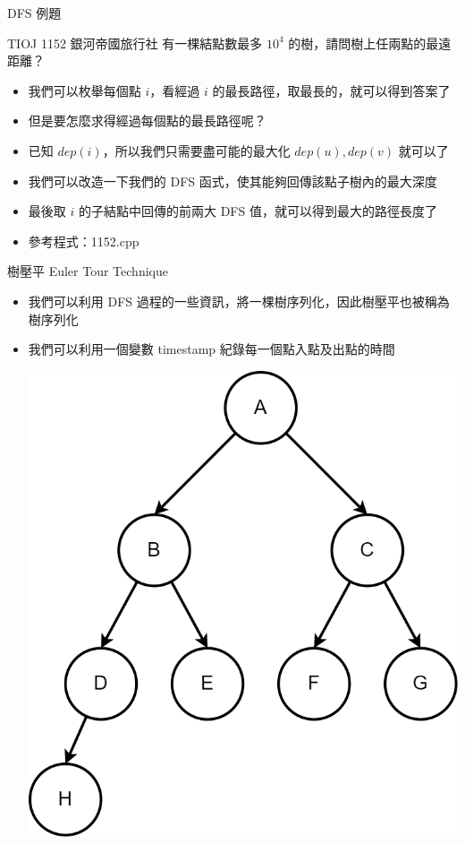 \documentclass[aspectratio=169]{beamer}
\begin{document}
    \begin{frame}{DFS 例題}
        \begin{block}{TIOJ 1152 銀河帝國旅行社}
            有一棵結點數最多 $10^4$ 的樹，請問樹上任兩點的最遠距離？
        \end{block}

        \begin{itemize}
            \item<2-> 我們可以枚舉每個點 $i$，看經過 $i$ 的最長路徑，取最長的，就可以得到答案了
            \item<3-> 但是要怎麼求得經過每個點的最長路徑呢？
            \item<4-> 已知 $dep(i)$，所以我們只需要盡可能的最大化 $dep(u), dep(v)$ 就可以了
            \item<5-> 我們可以改造一下我們的 DFS 函式，使其能夠回傳該點子樹內的最大深度
            \item<6-> 最後取 $i$ 的子結點中回傳的前兩大 DFS 值，就可以得到最大的路徑長度了
            \item<6-> 參考程式：1152.cpp
        \end{itemize}
    \end{frame}

    \begin{frame}{樹壓平 Euler Tour Technique}
        \begin{itemize}
            \item<1-> 我們可以利用 DFS 過程的一些資訊，將一棵樹序列化，因此樹壓平也被稱為樹序列化
            \item<2-> 我們可以利用一個變數 timestamp 紀錄每一個點入點及出點的時間
            \begin{center}
                \includegraphics[height=0.6\textheight]{src/ett_1.png}
            \end{center}
        \end{itemize}
    \end{frame}
\end{document}
